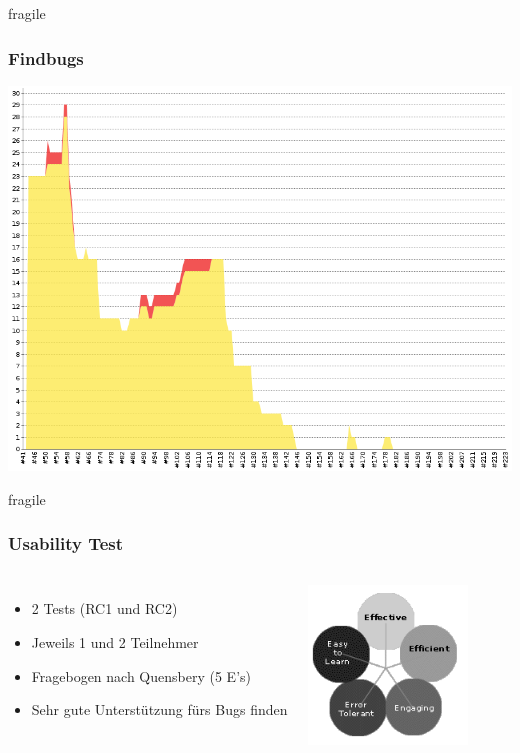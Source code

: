\documentclass[10pt, compress]{beamer}
\begin{document}
\begin{frame}{fragile}
   \frametitle{Findbugs}
\includegraphics[scale=0.35]{findbugs}
\end{frame}


\begin{frame}{fragile}
  \frametitle{Usability Test}
  \begin{columns}[onlytextwidth]
  \begin{itemize}
    \item 2 Tests (RC1 und RC2)
    \item Jeweils 1 und 2 Teilnehmer
    \item Fragebogen nach Quensbery (5 E's)
    \item Sehr gute Unterstützung fürs Bugs finden
  \end{itemize}
  
  \begin{center}
    \includegraphics[width=0.8\textwidth]{quesenbery}
  \end{center}
   
  \end{columns}
\end{frame}
\end{document}
